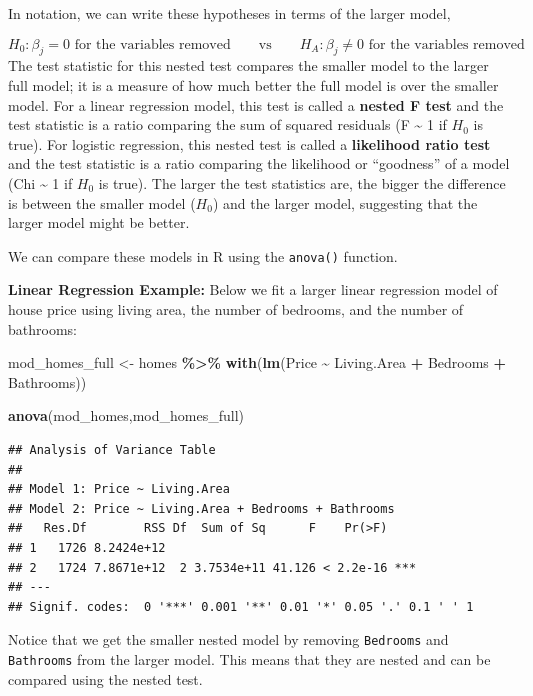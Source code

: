 \documentclass[
]{book}
\newenvironment{Shaded}{\begin{snugshade}}{\end{snugshade}}
\newcommand{\FunctionTok}[1]{\textcolor[rgb]{0.13,0.29,0.53}{\textbf{#1}}}
\newcommand{\NormalTok}[1]{#1}
\newcommand{\OtherTok}[1]{\textcolor[rgb]{0.56,0.35,0.01}{#1}}
\newcommand{\SpecialCharTok}[1]{\textcolor[rgb]{0.81,0.36,0.00}{\textbf{#1}}}
\begin{document}
In notation, we can write these hypotheses in terms of the larger model,

\[H_0: \beta_j = 0 \text{ for the variables removed} \qquad \text{vs} \qquad H_A: \beta_j \neq 0  \text{ for the variables removed}\]
The test statistic for this nested test compares the smaller model to the larger full model; it is a measure of how much better the full model is over the smaller model. For a linear regression model, this test is called a \textbf{nested F test} and the test statistic is a ratio comparing the sum of squared residuals (F \textasciitilde{} 1 if \(H_0\) is true). For logistic regression, this nested test is called a \textbf{likelihood ratio test} and the test statistic is a ratio comparing the likelihood or ``goodness'' of a model (Chi \textasciitilde{} 1 if \(H_0\) is true). The larger the test statistics are, the bigger the difference is between the smaller model (\(H_0\)) and the larger model, suggesting that the larger model might be better.

We can compare these models in R using the \texttt{anova()} function.

\textbf{Linear Regression Example:} Below we fit a larger linear regression model of house price using living area, the number of bedrooms, and the number of bathrooms:

\begin{Shaded}
\begin{Highlighting}[]
\NormalTok{mod\_homes\_full }\OtherTok{\textless{}{-}}\NormalTok{ homes }\SpecialCharTok{\%\textgreater{}\%}
  \FunctionTok{with}\NormalTok{(}\FunctionTok{lm}\NormalTok{(Price }\SpecialCharTok{\textasciitilde{}}\NormalTok{ Living.Area }\SpecialCharTok{+}\NormalTok{ Bedrooms }\SpecialCharTok{+}\NormalTok{ Bathrooms))}

\FunctionTok{anova}\NormalTok{(mod\_homes,mod\_homes\_full)}
\end{Highlighting}
\end{Shaded}

\begin{verbatim}
## Analysis of Variance Table
## 
## Model 1: Price ~ Living.Area
## Model 2: Price ~ Living.Area + Bedrooms + Bathrooms
##   Res.Df        RSS Df  Sum of Sq      F    Pr(>F)    
## 1   1726 8.2424e+12                                   
## 2   1724 7.8671e+12  2 3.7534e+11 41.126 < 2.2e-16 ***
## ---
## Signif. codes:  0 '***' 0.001 '**' 0.01 '*' 0.05 '.' 0.1 ' ' 1
\end{verbatim}

Notice that we get the smaller nested model by removing \texttt{Bedrooms} and \texttt{Bathrooms} from the larger model. This means that they are nested and can be compared using the nested test.
\end{document}
